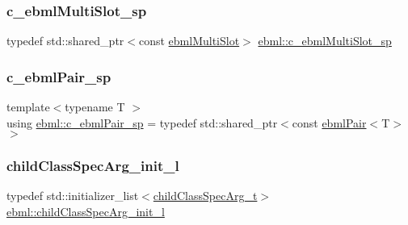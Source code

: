 \mbox{\label{namespaceebml_a2b7466e45489d2a5dbfa29b411eb4ed0}} 
\subsubsection{\texorpdfstring{c\+\_\+ebml\+Multi\+Slot\+\_\+sp}{c\_ebmlMultiSlot\_sp}}
{\footnotesize\ttfamily typedef std\+::shared\+\_\+ptr$<$const \mbox{\hyperlink{classebml_1_1ebmlMultiSlot}{ebml\+Multi\+Slot}}$>$ \mbox{\hyperlink{namespaceebml_a2b7466e45489d2a5dbfa29b411eb4ed0}{ebml\+::c\+\_\+ebml\+Multi\+Slot\+\_\+sp}}}

\mbox{\label{namespaceebml_a9c804317d5b51ef8844bdffe5e8cb4b3}} 
\subsubsection{\texorpdfstring{c\+\_\+ebml\+Pair\+\_\+sp}{c\_ebmlPair\_sp}}
{\footnotesize\ttfamily template$<$typename T $>$ \\
using \mbox{\hyperlink{namespaceebml_a9c804317d5b51ef8844bdffe5e8cb4b3}{ebml\+::c\+\_\+ebml\+Pair\+\_\+sp}} = typedef std\+::shared\+\_\+ptr$<$const \mbox{\hyperlink{classebml_1_1ebmlPair}{ebml\+Pair}}$<$T$>$ $>$}

\mbox{\label{namespaceebml_a40cf7ad4b58caaa8c07da3ed83f7a431}} 
\subsubsection{\texorpdfstring{child\+Class\+Spec\+Arg\+\_\+init\+\_\+l}{childClassSpecArg\_init\_l}}
{\footnotesize\ttfamily typedef std\+::initializer\+\_\+list$<$\mbox{\hyperlink{structebml_1_1childClassSpecArg__t}{child\+Class\+Spec\+Arg\+\_\+t}}$>$ \mbox{\hyperlink{namespaceebml_a40cf7ad4b58caaa8c07da3ed83f7a431}{ebml\+::child\+Class\+Spec\+Arg\+\_\+init\+\_\+l}}}

\mbox{\label{namespaceebml_abf07998998c284c9be3f76b5d9e192e1}} 
